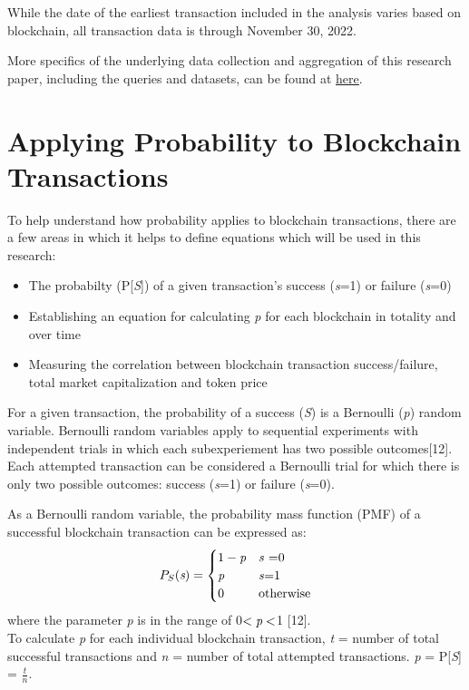 \documentclass[12pt]{article}
\begin{document}
While the date of the earliest transaction included in the analysis varies based on blockchain, all transaction data is through November 30, 2022.

More specifics of the underlying data collection and aggregation of this research paper, including the queries and datasets, can be found at \href{http://github.com/jamesomalley/EE104}{\underline{here}}.

\section{Applying Probability to Blockchain Transactions}
To help understand how probability applies to blockchain transactions, there are a few areas in which it helps to define equations which will be used in this research:
\begin{itemize}
	\item The probabilty (P[\emph{S}]) of a given transaction's success (\emph{s}=1) or failure (\emph{s}=0)
	\item Establishing an equation for calculating \emph{p} for each blockchain in totality and over time
	\item Measuring the correlation between blockchain transaction success/failure, total market capitalization and token price
\end{itemize}
For a given transaction, the probability of a success (\emph{S}) is a Bernoulli (\emph{p}) random variable. Bernoulli random variables apply to sequential experiments with independent trials in which each subexperiement has two possible outcomes[12]. Each attempted transaction can be considered a Bernoulli trial for which there is only two possible outcomes: success (\emph{s}=1) or failure (\emph{s}=0). 	

As a Bernoulli random variable, the probability mass function (PMF) of a successful blockchain transaction can be expressed as:
\[
P_{S}(\emph{s}) =
\begin{cases}
1-\emph{p}&\text{\emph{s} =0}\\
\emph{p}&\text{\emph{s}=1}\\
0&\text{otherwise}\\
\end{cases}
\]
where the parameter \emph{p} is in the range of 0$<\emph{p}<$1 [12].\\
To calculate \emph{p} for each individual blockchain transaction, \emph{t} = number of total successful transactions and \emph{n} = number of total attempted transactions. \emph{p} = P[\emph{S}] = \(\frac{t}{n}\). 
\end{document}
